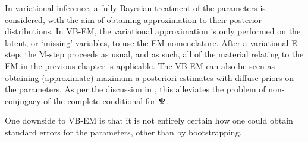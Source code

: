 In variational inference, a fully Bayesian treatment of the parameters is considered, with the aim of obtaining approximation to their posterior distributions.
In VB-EM, the variational approximation is only performed on the latent, or `missing' variables, to use the EM nomenclature.
After a variational E-step, the M-step proceeds as usual, and as such, all of the material relating to the EM in the previous chapter is applicable.
The VB-EM can also be seen as obtaining (approximate) maximum a posteriori estimates with diffuse priors on the parameters.
As per the discussion in , this alleviates the problem of non-conjugacy of the complete conditional for ${\bm\Psi}$.

One downside to VB-EM is that it is not entirely certain how one could obtain standard errors for the parameters, other than by bootstrapping.










